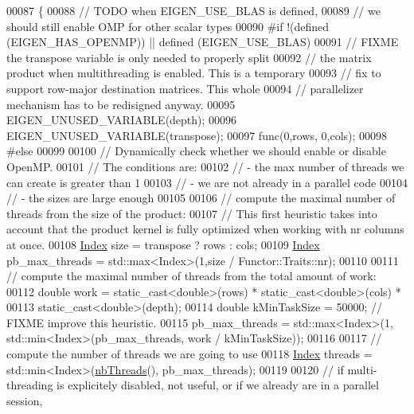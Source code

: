\begin{DoxyCode}
00087 \{
00088   \textcolor{comment}{// TODO when EIGEN\_USE\_BLAS is defined,}
00089   \textcolor{comment}{// we should still enable OMP for other scalar types}
00090 \textcolor{preprocessor}{#if !(defined (EIGEN\_HAS\_OPENMP)) || defined (EIGEN\_USE\_BLAS)}
00091   \textcolor{comment}{// FIXME the transpose variable is only needed to properly split}
00092   \textcolor{comment}{// the matrix product when multithreading is enabled. This is a temporary}
00093   \textcolor{comment}{// fix to support row-major destination matrices. This whole}
00094   \textcolor{comment}{// parallelizer mechanism has to be redisigned anyway.}
00095   EIGEN\_UNUSED\_VARIABLE(depth);
00096   EIGEN\_UNUSED\_VARIABLE(transpose);
00097   func(0,rows, 0,cols);
00098 \textcolor{preprocessor}{#else}
00099 
00100   \textcolor{comment}{// Dynamically check whether we should enable or disable OpenMP.}
00101   \textcolor{comment}{// The conditions are:}
00102   \textcolor{comment}{// - the max number of threads we can create is greater than 1}
00103   \textcolor{comment}{// - we are not already in a parallel code}
00104   \textcolor{comment}{// - the sizes are large enough}
00105 
00106   \textcolor{comment}{// compute the maximal number of threads from the size of the product:}
00107   \textcolor{comment}{// This first heuristic takes into account that the product kernel is fully optimized when working with
       nr columns at once.}
00108   \hyperlink{namespace_eigen_a62e77e0933482dafde8fe197d9a2cfde}{Index} size = transpose ? rows : cols;
00109   \hyperlink{namespace_eigen_a62e77e0933482dafde8fe197d9a2cfde}{Index} pb\_max\_threads = std::max<Index>(1,size / Functor::Traits::nr);
00110 
00111   \textcolor{comment}{// compute the maximal number of threads from the total amount of work:}
00112   \textcolor{keywordtype}{double} work = \textcolor{keyword}{static\_cast<}\textcolor{keywordtype}{double}\textcolor{keyword}{>}(rows) * static\_cast<double>(cols) *
00113       \textcolor{keyword}{static\_cast<}\textcolor{keywordtype}{double}\textcolor{keyword}{>}(depth);
00114   \textcolor{keywordtype}{double} kMinTaskSize = 50000;  \textcolor{comment}{// FIXME improve this heuristic.}
00115   pb\_max\_threads = std::max<Index>(1, std::min<Index>(pb\_max\_threads, work / kMinTaskSize));
00116 
00117   \textcolor{comment}{// compute the number of threads we are going to use}
00118   \hyperlink{namespace_eigen_a62e77e0933482dafde8fe197d9a2cfde}{Index} threads = std::min<Index>(\hyperlink{namespace_eigen_a9aca97d83e21b91a04ec079360dfffeb}{nbThreads}(), pb\_max\_threads);
00119 
00120   \textcolor{comment}{// if multi-threading is explicitely disabled, not useful, or if we already are in a parallel session,}

\end{DoxyCode}
